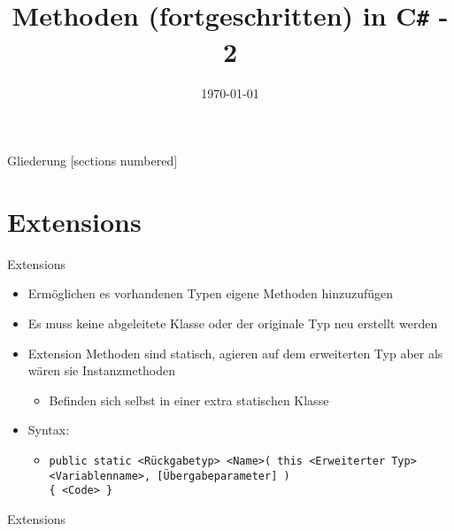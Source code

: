 



\title{Methoden (fortgeschritten) in C\texttt{\#} - 2}
\date{\today}




\maketitle

\begin{frame}{Gliederung}
	[sections numbered]
	\tableofcontents
\end{frame}

\section{Extensions}
\begin{frame}{Extensions}
	\begin{itemize}
		\item Ermöglichen es vorhandenen Typen eigene Methoden hinzuzufügen
		\item Es muss keine abgeleitete Klasse oder der originale Typ neu erstellt werden
		\item Extension Methoden sind statisch, agieren auf dem erweiterten Typ aber als wären sie Instanzmethoden
		\begin{itemize}
			\item Befinden sich selbst in einer extra statischen Klasse
		\end{itemize}				
		\item Syntax:
		\begin{itemize}
			\item \texttt{public static \alert{<Rückgabetyp> <Name>}( this \alert{<Erweiterter Typ> <Variablenname>}, \alert{[Übergabeparameter]} )\\ \{ \alert{<Code>} \}}
		\end{itemize}
	\end{itemize}
\end{frame}

\begin{frame}{Extensions}
	
\end{frame}

